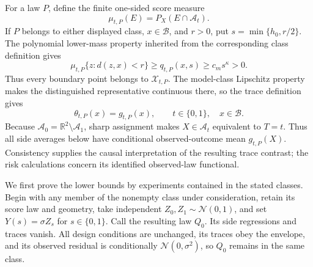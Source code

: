 For a law \(P\), define the finite one-sided score measure
\[
 \mu_{t,P}(E)=P_X(E\cap\mathcal A_t).
\]
If \(P\) belongs to either displayed class, \(x\in\mathcal B\), and
\(r>0\), put \(s=\min\{h_0,r/2\}\).  The polynomial lower-mass property
inherited from the corresponding class definition gives
\[
 \mu_{t,P}\{z:d(z,x)<r\}
 \ge q_{t,P}(x,s)
 \ge c_ms^{\kappa}>0. \tag{23}
\]
Thus every boundary point belongs to \(\mathcal X_{t,P}\).  The
model-class Lipschitz property makes the distinguished representative
continuous there, so the trace definition gives
\[
 \theta_{t,P}(x)=g_{t,P}(x),
 \qquad t\in\{0,1\},\quad x\in\mathcal B. \tag{24}
\]
Because \(\mathcal A_0=\mathbb R^2\setminus\mathcal A_1\), sharp
assignment makes \(X\in\mathcal A_t\) equivalent to \(T=t\).  Thus all
side averages below have conditional observed-outcome mean
\(g_{t,P}(X)\).  Consistency supplies the causal interpretation of the
resulting trace contrast; the risk calculations concern its identified
observed-law functional.

We first prove the lower bounds by experiments contained in the stated
classes.  Begin with any member of the nonempty class under
consideration, retain its score law and geometry, take independent
\(Z_0,Z_1\sim\mathcal N(0,1)\), and set \(Y(s)=\sigma Z_s\) for
\(s\in\{0,1\}\).  Call the resulting law \(Q_0\).  Its side regressions
and traces vanish.  All design conditions are unchanged, its traces obey
the envelope, and its observed residual is conditionally
\(\mathcal N(0,\sigma^2)\), so \(Q_0\) remains in the same class.

